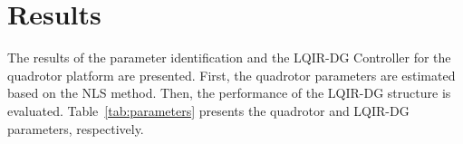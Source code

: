 \documentclass[3p]{elsarticle}
\begin{document}






\section{Results}\label{sec:results}
\noindent The results of the parameter identification and the LQIR-DG Controller for the quadrotor platform are presented. First, the quadrotor parameters are estimated based on the NLS method. Then, the performance of the LQIR-DG structure is evaluated.
Table~\ref{tab:parameters} presents the quadrotor and LQIR-DG parameters, respectively.
\end{document}
